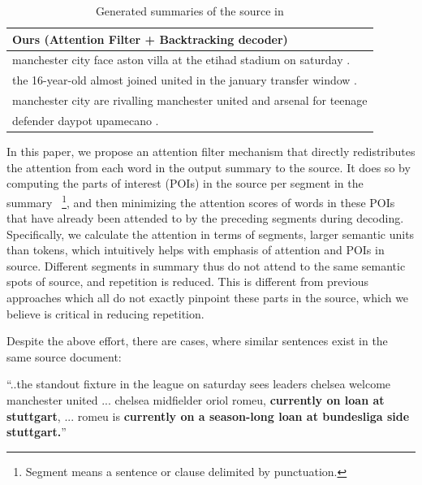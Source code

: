 \begin{table}[th]
\begin{center}
\begin{tabular}{|l|}
\hline \bf Ours (Attention Filter + Backtracking decoder) \\
\hline manchester city face aston villa at the etihad stadium on saturday . \\
       the 16-year-old almost joined united in the january transfer window . \\
	   manchester city are rivalling manchester united and arsenal for teenage \\
	   defender daypot upamecano .\\
\hline
\end{tabular}
\end{center}
\caption{\label{tab:strong_methods} Generated summaries of the source in }
\end{table}

In this paper, we propose an attention filter mechanism that directly 
redistributes the attention from each word in the output summary to the source. 
It does so by computing the parts of interest (POIs) in the source
per segment in the summary~
\footnote{Segment means a sentence or clause delimited by punctuation.}, 
and then minimizing the attention scores of
words in these POIs that have already been attended to by the preceding 
segments during decoding. 
Specifically, we calculate the attention in terms of segments, larger semantic units than tokens, 
which intuitively helps with emphasis of attention and POIs in source.
Different segments in summary thus do not attend to the same semantic spots
of source, and repetition is reduced. 
This is different from previous approaches
which all do not exactly pinpoint these parts in the source,
which we believe is critical in reducing repetition. 

Despite the above effort, there are cases, where similar sentences 
exist in the same source document:
\begin{example}
\label{ex:repeatsrc}
\small{``..the standout fixture in the league on saturday sees leaders 
	   chelsea welcome manchester united ... chelsea midfielder oriol romeu, 
\textbf{currently on loan at stuttgart}, ... romeu is 
\textbf{currently on a season-long loan at bundesliga side stuttgart.}''} 
\end{example}

